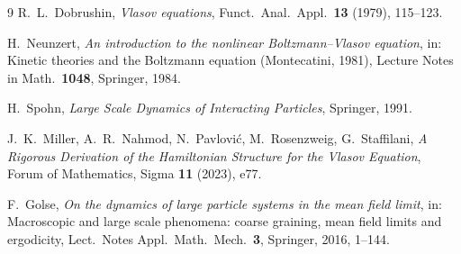\documentclass[11pt]{article}
\theoremstyle{definition}
\theoremstyle{remark}
\begin{document}
\begin{thebibliography}{9}
R.\ L.\ Dobrushin, \emph{Vlasov equations}, Funct.\ Anal.\ Appl.\ \textbf{13} (1979), 115--123.

H.\ Neunzert, \emph{An introduction to the nonlinear Boltzmann--Vlasov equation},
in: Kinetic theories and the Boltzmann equation (Montecatini, 1981), Lecture Notes in Math.\
\textbf{1048}, Springer, 1984.

H.\ Spohn, \emph{Large Scale Dynamics of Interacting Particles}, Springer, 1991.

J.\ K.\ Miller, A.\ R.\ Nahmod, N.\ Pavlovi\'c, M.\ Rosenzweig, G.\ Staffilani,
\emph{A Rigorous Derivation of the Hamiltonian Structure for the Vlasov Equation},
Forum of Mathematics, Sigma \textbf{11} (2023), e77.

F.\ Golse, \emph{On the dynamics of large particle systems in the mean field limit},
in: Macroscopic and large scale phenomena: coarse graining, mean field limits and ergodicity,
Lect.\ Notes Appl.\ Math.\ Mech.\ \textbf{3}, Springer, 2016, 1--144.
\end{thebibliography}
\end{document}

